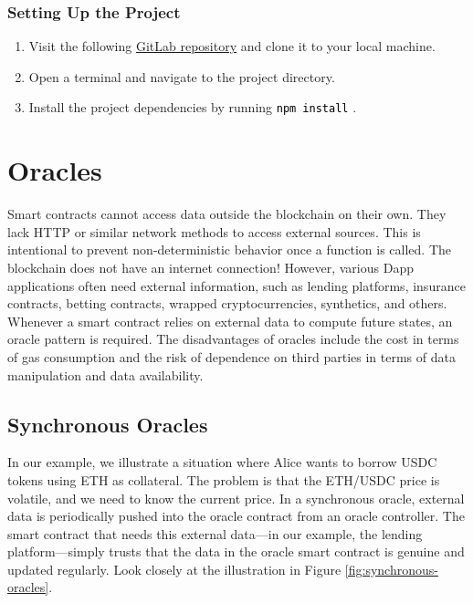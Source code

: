 \documentclass[12pt]{article}
\newcommand{\codegrey}[1]{%
  \texttt{\colorbox{black!4}{\textcolor{black}{#1}}}%
}
\begin{document}
\subsubsection*{Setting Up the Project}

\begin{enumerate}
    \item Visit the following \href{https://gitlab.fel.cvut.cz/radovluk/smart-contracts-exercises/-/tree/main/06-Fool-the-Oracle/task/task-code}{GitLab repository} and clone it to your local machine.
    \item Open a terminal and navigate to the project directory.
    \item Install the project dependencies by running \codegrey{npm install}.
\end{enumerate}

\section{Oracles}
Smart contracts cannot access data outside the blockchain on their own. They lack HTTP or similar network methods to access external sources. This is intentional to prevent non-deterministic behavior once a function is called. The blockchain does not have an internet connection! However, various Dapp applications often need external information, such as lending platforms, insurance contracts, betting contracts, wrapped cryptocurrencies, synthetics, and others. Whenever a smart contract relies on external data to compute future states, an oracle pattern is required. The disadvantages of oracles include the cost in terms of gas consumption and the risk of dependence on third parties in terms of data manipulation and data availability.

\subsection*{Synchronous Oracles}

In our example, we illustrate a situation where Alice wants to borrow USDC tokens using ETH as collateral. The problem is that the ETH/USDC price is volatile, and we need to know the current price. In a synchronous oracle, external data is periodically pushed into the oracle contract from an oracle controller. The smart contract that needs this external data—in our example, the lending platform—simply trusts that the data in the oracle smart contract is genuine and updated regularly. Look closely at the illustration in Figure \ref{fig:synchronous-oracles}. %
\end{document}
